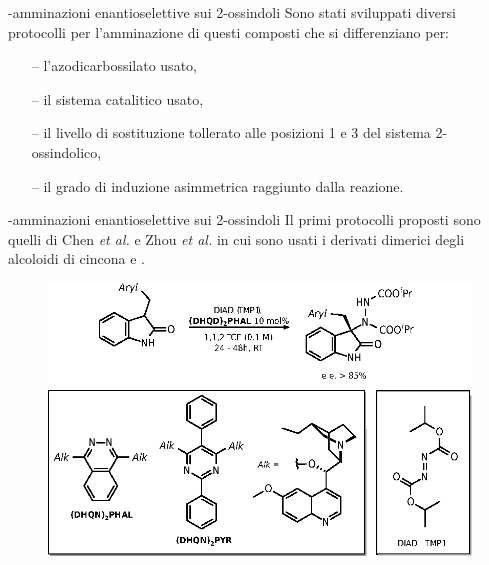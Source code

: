 \documentclass[10pt]{beamer}
\begin{document}
\begin{frame}[fragile]{{\textalpha}-amminazioni enantioselettive sui 2-ossindoli}
Sono stati sviluppati \alert{diversi protocolli} per l'amminazione di questi composti che si differenziano per:
\begin{itemize}
	\item[--] l'azodicarbossilato usato,
	\item[--] il sistema catalitico usato,
	\item[--] il livello di sostituzione tollerato alle posizioni 1 e 3 del sistema 2-ossindolico,
	\item[--] il grado di induzione asimmetrica raggiunto dalla reazione.	
\end{itemize}
\end{frame}

\begin{frame}[fragile]{{\textalpha}-amminazioni enantioselettive sui 2-ossindoli}
Il primi protocolli proposti sono quelli di Chen \textit{et al.} e  Zhou \textit{et al.} in cui sono usati i \alert{derivati dimerici degli alcoloidi di cincona} \textbf{} e \textbf{}.
\begin{figure}[H] 
	\centering
	\includegraphics[scale=0.7]{P_chenoaaa.eps}
\end{figure} 
\end{frame}
\end{document}
